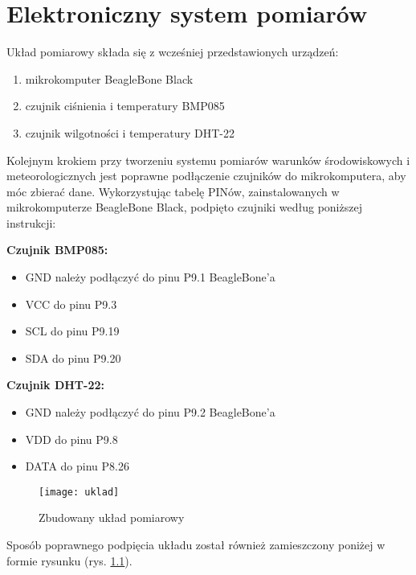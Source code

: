 \chapter{Elektroniczny system pomiarów}
Układ pomiarowy składa się z wcześniej przedstawionych urządzeń:

\begin{enumerate}
\item mikrokomputer BeagleBone Black
\item czujnik ciśnienia i temperatury BMP085
\item czujnik wilgotności i temperatury DHT-22
\end{enumerate}

Kolejnym krokiem przy tworzeniu systemu pomiarów warunków środowiskowych i meteorologicznych jest poprawne podłączenie czujników do mikrokomputera, aby móc zbierać dane. Wykorzystując tabelę PINów, zainstalowanych w mikrokomputerze BeagleBone Black, podpięto czujniki według poniższej instrukcji:

\textbf{Czujnik BMP085:}
\begin{itemize}
\item GND należy podłączyć do pinu P9.1 BeagleBone'a
\item VCC do pinu P9.3
\item SCL do pinu P9.19
\item SDA do pinu P9.20
\end{itemize}

\textbf{Czujnik DHT-22:}
\begin{itemize}
\item GND należy podłączyć do pinu P9.2 BeagleBone'a
\item VDD do pinu P9.8
\item DATA do pinu P8.26
\end{itemize}

\begin{figure}[h]
\centering
\texttt{[image: uklad]}
\caption{Zbudowany układ pomiarowy}
\label{fig:uklad}
\end{figure}

Sposób poprawnego podpięcia układu został również zamieszczony poniżej w formie rysunku (rys. \ref{fig:uklad}).